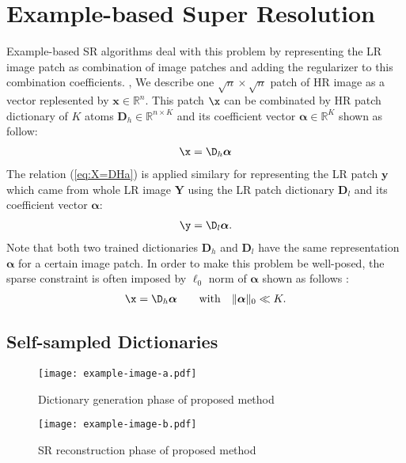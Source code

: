 \documentclass[10pt,japanese]{ikelab-sips}
\begin{document}
\section{Example-based Super Resolution} \label{sec:ebsr}
\renewcommand{\l}{\left}
\renewcommand{\r}{\right}
\newcommand{\asVector}[1]{\expandafter\def\csname #1\endcsname{{\bm{#1}}}}
\asVector{X}
\asVector{Y}
\asVector{D}
\asVector{F}
\asVector{I}
\asVector{x}
\asVector{y}
\asVector{f}
\renewcommand{\a}{\bm{\alpha}}
Example-based SR algorithms deal with this problem by representing
the LR image patch as combination of image patches and adding
the regularizer to this combination coefficients.
\cite{IEEEexample:conf_typical,IEEEexample:article_typical},
We describe one
$\sqrt{n}\times\sqrt{n}$
patch of HR image as a vector
replesented by $\bm{x}\in\mathbb{R}^{n}$.
This patch $\x$ can be combinated by
HR patch dictionary of $K$ atoms $\bm{D}_{h}\in\mathbb{R}^{n \times K}$
and its coefficient vector $\bm{\alpha} \in \mathbb{R}^{K}$
shown as follow: %
%
\begin{align}
 \x=\D_h\a\label{eq:X=DHa}
\end{align}
%
The relation (\ref{eq:X=DHa}) is applied similary
for representing the LR patch $\bm{y}$ which came from whole LR image $\bm{Y}$
using the LR patch dictionary $\bm{D}_{l}$ and its coefficient vector $\a$:
%
\begin{align}
 \y=\D_l\a.
\end{align}
%
Note that both two trained dictionaries $\bm{D}_{h}$ and $\bm{D}_{l}$ have
the same representation $\bm{\alpha}$ for a certain image patch.
In order to make this problem be well-posed, the sparse constraint is often imposed
by $\ell_0$ norm of $\a$ shown as follows \cite{Yang2008,Yang2010}:
%
\begin{align}
\x = \D_h\a\qquad\mathrm{with}\quad\|\a\|_0 \ll K.
\label{eq:X=DHa_sparse}
\end{align}
%

\subsection{Self-sampled Dictionaries}\label{sec:self-sampled}
%
\begin{figure}[t]
 \centering
 \texttt{[image: example-image-a.pdf]}
\caption{Dictionary generation phase of proposed method}
\label{fig:sd_dic}
\end{figure}

\begin{figure}[t]
 \centering
 \texttt{[image: example-image-b.pdf]}
\caption{SR reconstruction phase of proposed method}
\label{fig:sd_sr}
\end{figure}
\end{document}

